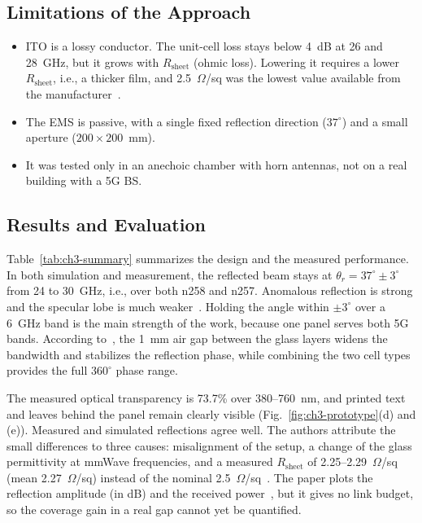 \subsection{Limitations of the Approach}
\begin{itemize}
    \item ITO is a lossy conductor. The unit-cell loss stays below 4~dB at 26 and 28~GHz, but it grows with $R_{\mathrm{sheet}}$ (ohmic loss). Lowering it requires a lower $R_{\mathrm{sheet}}$, i.e., a thicker film, and 2.5~$\Omega$/sq was the lowest value available from the manufacturer~\cite{AlNuaimi2026}.
    \item The EMS is passive, with a single fixed reflection direction ($37^\circ$) and a small aperture ($200 \times 200$~mm).
    \item It was tested only in an anechoic chamber with horn antennas, not on a real building with a 5G BS.
\end{itemize}

\subsection{Results and Evaluation}
Table~\ref{tab:ch3-summary} summarizes the design and the measured performance. In both simulation and measurement, the reflected beam stays at $\theta_r = 37^\circ \pm 3^\circ$ from 24 to 30~GHz, i.e., over both n258 and n257. Anomalous reflection is strong and the specular lobe is much weaker~\cite{AlNuaimi2026}. Holding the angle within $\pm 3^\circ$ over a 6~GHz band is the main strength of the work, because one panel serves both 5G bands. According to~\cite{AlNuaimi2026}, the 1~mm air gap between the glass layers widens the bandwidth and stabilizes the reflection phase, while combining the two cell types provides the full $360^\circ$ phase range.

The measured optical transparency is 73.7\% over 380--760~nm, and printed text and leaves behind the panel remain clearly visible (Fig.~\ref{fig:ch3-prototype}(d) and (e)). Measured and simulated reflections agree well. The authors attribute the small differences to three causes: misalignment of the setup, a change of the glass permittivity at mmWave frequencies, and a measured $R_{\mathrm{sheet}}$ of 2.25--2.29~$\Omega$/sq (mean 2.27~$\Omega$/sq) instead of the nominal 2.5~$\Omega$/sq~\cite{AlNuaimi2026}. The paper plots the reflection amplitude (in dB) and the received power~\cite{AlNuaimi2026}, but it gives no link budget, so the coverage gain in a real gap cannot yet be quantified.

